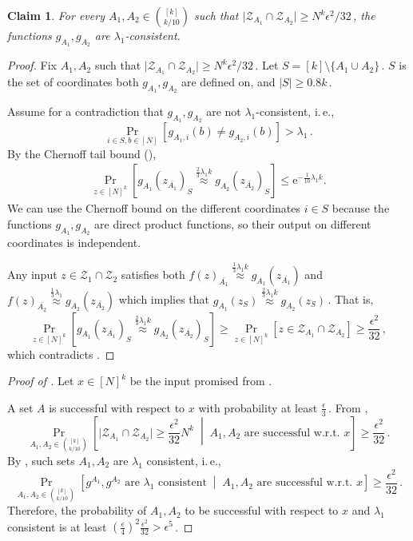 \documentclass[11pt]{article}
\numberwithin{equation}{section}
\newtheorem{claim}[theorem]{Claim}
\theoremstyle{definition}
\theoremstyle{plain}
\newcommand{\eee}{\mathrm e}
\newcommand{\ie}{i.\,e.}
\newcommand{\Prob}[2][]{\Pr_{{#1}}\left[#2\right]} %
\newcommand{\Paren}[1]{\left(#1\right)} %
\newcommand{\abs}[1]{\lvert#1\rvert} %
\newcommand{\given}{\;\middle\vert\;} %
\newcommand{\set}[1]{\{#1\}} %
\newcommand\f{f} %
\newcommand{\g}{g} %
\newcommand\neql[1]{\stackrel{{#1}}{ \approx}} %
\newcommand\rest[1]{{\bar{#1}}}  %
\newcommand\zi{\mathcal{Z}} %
\begin{document}
\begin{claim}\label{claim: consistent sets}
	For every $A_1,A_2\in\binom{[k]}{k/10}$ such that $\abs{\zi_{A_1}\cap\zi_{A_2}} \geq 
N^k\epsilon^2/32$\,, %
 the functions $\g_{A_1},\g_{A_2}$ are $\lambda_1$-consistent.
\end{claim}
\begin{proof}
	Fix $A_1,A_2$ such that $\abs{\zi_{A_1}\cap\zi_{A_2}} \geq 
N^k\epsilon^2/32$\,. %
 Let $S = [k]\setminus\set{A_1\cup A_2}$\,. $S$ is the set of coordinates both $\g_{A_1},\g_{A_2}$ are defined on, and $\abs{S}\geq 0.8k$\,.
	
Assume  %
for  %
a contradiction that $\g_{A_1},\g_{A_2}$ are not $\lambda_1$-consistent, \ie, %
\[\Prob[{i\in S,b\in [N]}]{g_{A_1,i}(b)\neq g_{A_2,i}(b)} > \lambda_1\,.\]
By %
the  %
Chernoff tail bound  %
(),  %
	\begin{align}\label{eq:inconsistent g_A} \Prob[{z\in [N]^k}]{\g_{A_1}(z_{\rest{A_1}})_S\neql{\frac{2}{3}\lambda_1 k}\g_{A_2}(z_{\rest{A_2}})_S}  
	\leq \eee^{-\frac{1}{10}\lambda_1 k}. \end{align}
We can use %
the  %
Chernoff bound on the different coordinates $i\in S$ because the functions $\g_{A_1},\g_{A_2}$ are direct product functions, so their output on different coordinates is independent.
	
	Any input $z\in \zi_{1}\cap \zi_2$ satisfies both $\f(z)_{\rest{A_1}}\neql{\frac{1}{3}\lambda_1 k}\g_{A_1}(z_{\rest{A_1}})$ and $\f(z)_{\rest{A_2}}\neql{\frac{1}{3}\lambda_1}\g_{A_2}(z_{\rest{A_2}})$ which implies that $\g_{A_1}(z_S)\neql{\frac{2}{3}\lambda_1 k}\g_{A_2}(z_S) $\,. That is, 
	\[ \Prob[{z\in [N]^k}]{\g_{A_1}(z_{\rest{A_1}})_S\neql{\frac{2}{3}\lambda_1 k}\g_{A_2}(z_{\rest{A_2}})_S} \geq \Prob[{z\in [N]^k}]{z\in \zi_{A_1}\cap \zi_{A_2}}\geq \frac{\epsilon^2}{32} \,,\] %
		which contradicts .
\end{proof}

\begin{proof}[Proof of ]
	Let $x\in[N]^k$ be the input promised from . 
	
	
    A set $A$ is successful with respect to $x$ with probability at least $\frac{\epsilon}{3}$\,. 
	From ,
	\[\Prob[A_1,A_2\in\binom{[k]}{k/10}]{\abs{\zi_{A_1}\cap\zi_{A_2}}\geq \frac{\epsilon^2}{32}N^k\given A_1,A_2 \textrm{ are successful w.r.t. }x } \geq \frac{\epsilon^2}{32}\,.\]
	By , such sets $A_1,A_2$ are $\lambda_1$ consistent, \ie,
	\[\Prob[A_1,A_2\in\binom{[k]}{k/10}]{\g^{A_1},\g^{A_2} \textrm{ are } \lambda_1 \textrm{ consistent}\given A_1,A_2 \textrm{ are successful w.r.t. }x } \geq \frac{\epsilon^2}{32} \,.\] %
	Therefore, the probability of $A_1,A_2$ to be successful with respect to $x$ and $\lambda_1$ consistent is at least $\Paren{\frac{\epsilon}{4}}^2\frac{\epsilon^2}{32} > \epsilon^5$\,.
\end{proof}
\end{document}
